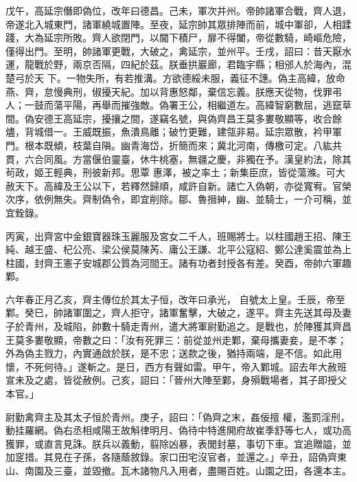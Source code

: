 \begin{pinyinscope}
 戊午，高延宗僭即偽位，改年曰德昌。己未，軍次并州。帝帥諸軍合戰，齊人退，帝遂北入城東門，諸軍繞城置陣。至夜，延宗帥其眾排陣而前，城中軍卻，人相蹂踐，大為延宗所敗。齊人欲閉門，以閫下積尸，扉不得闔，帝從數騎，崎嶇危險，僅得出門。至明，帥諸軍更戰，大破之，禽延宗，並州平。壬戌，詔曰：昔天厭水運，龍戰於野，兩京否隔，四紀於茲。朕垂拱巖廊，君臨宇縣；相邠人於海內，混楚弓於天
 下。一物失所，有若推溝。方欲德綏未服，義征不譓。偽主高緯，放命燕、齊，怠慢典刑，俶擾天紀。加以背惠怒鄰，棄信忘義。朕應天從物，伐罪弔人；一鼓而蕩平陽，再舉而摧強敵。偽署王公，相繼道左。高緯智窮數屈，逃竄草間。偽安德王高延宗，擾攘之間，遂竊名號，與偽齊昌王莫多婁敬顯等，收合餘燼，背城借一。王威既振，魚潰鳥離；破竹更難，建瓴非易。延宗眾散，衿甲軍門。根本既傾，枝葉自隕。幽青海岱，折簡而來；冀北河南，傳檄可定。八紘共貫，六合同風。方當偃伯靈臺，休牛桃塞，無疆之慶，非獨在予。漢皇約法，除其茍政，姬王輕典，刑彼新邦。思覃
 惠澤，被之率土；新集臣庶，皆從蕩滌。可大赦天下。高緯及王公以下，若釋然歸順，咸許自新。諸亡入偽朝，亦從寬宥。官榮次序，依例無失。齊制偽令，即宜削除。鄒、魯搢紳，幽、並騎士，一介可稱，並宜銓錄。



 丙寅，出齊宮中金銀寶器珠玉麗服及宮女二千人，班賜將士。以柱國趙王招、陳王純、越王盛、杞公亮、梁公侯莫陳芮、庸公王謙、北平公寇紹、鄭公達奚震並為上柱國，封齊王憲子安城郡公質為河間王。諸有功者封授各有差。癸酉，帝帥六軍趣鄴。



 六年春正月乙亥，齊主傳位於其太子恒，改年曰承光，
 自號太上皇。壬辰，帝至鄴。癸巳，帥諸軍圍之，齊人拒守，諸軍奮擊，大破之，遂平。齊主先送其母及妻子於青州，及城陷，帥數十騎走青州，遣大將軍尉勤追之。是戰也，於陣獲其齊昌王莫多婁敬顯，帝數之曰：「汝有死罪三：前從並州走鄴，棄母攜妻妾，是不孝；外為偽主戮力，內實通啟於朕，是不忠；送款之後，猶持兩端，是不信。如此用懷，不死何待。」遂斬之。是日，西方有聲如雷。甲午，帝入鄴城。詔去年大赦班宣未及之處，皆從赦例。己亥，詔曰：「晉州大陣至鄴，身殞戰場者，其子即授父本官。」



 尉勤禽齊主及其太子恒於青州。庚子，詔曰：「偽齊之末，姦佞擅
 權，濫罰淫刑，動挂羅網。偽右丞相咸陽王故斛律明月、偽待中特進開府故崔季舒等七人，或功高獲罪，或直言見誅。朕兵以義動，翦除凶暴，表閭封墓，事切下車。宜追贈謚，並加窆措。其見在子孫，各隨蔭敘錄。家口田宅沒官者，並還之。」辛丑，詔偽齊東山、南園及三臺，並毀撤。瓦木諸物凡入用者，盡賜百姓。山園之田，各還本主。




\end{pinyinscope}
